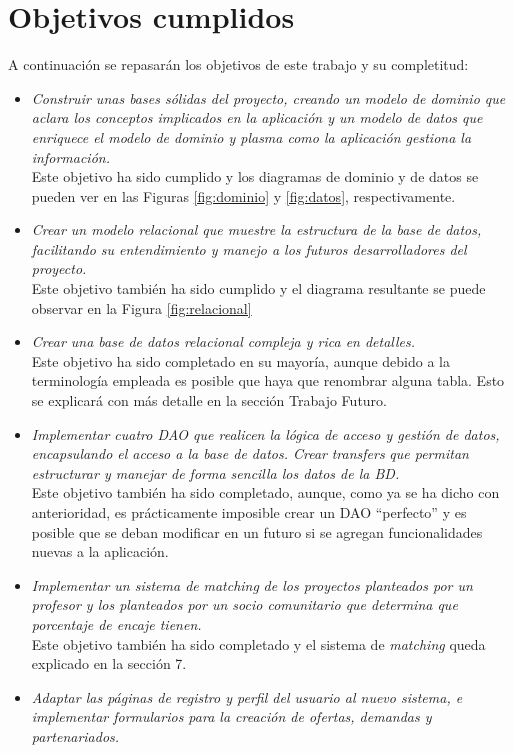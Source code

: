 \documentclass[11pt]{book}
\begin{document}
\section{Objetivos cumplidos}
A continuación se repasarán los objetivos de este trabajo y su completitud:
\begin{itemize}
	\item \emph{Construir unas bases sólidas del proyecto, creando un modelo de dominio que aclara los conceptos implicados en la aplicación y un modelo de datos que enriquece el modelo de dominio y plasma como la aplicación gestiona la información.}\\
	Este objetivo ha sido cumplido y los diagramas de dominio y de datos se pueden ver en las Figuras \ref{fig:dominio} y \ref{fig:datos}, respectivamente.
	\item \emph{Crear un modelo relacional que muestre la estructura de la base de datos, facilitando su entendimiento y manejo a los futuros desarrolladores del proyecto.}\\
	Este objetivo también ha sido cumplido y el diagrama resultante se puede observar en la Figura \ref{fig:relacional}
	\item \emph{Crear una base de datos relacional compleja y rica en detalles.} \\
	Este objetivo ha sido completado en su mayoría, aunque debido a la terminología empleada es posible que haya que renombrar alguna tabla. Esto se explicará con más detalle en la sección Trabajo Futuro.
	\item \emph{Implementar cuatro DAO que realicen la lógica de acceso y gestión de datos, encapsulando el acceso a la base de datos. Crear }\emph{transfers} \emph{que permitan estructurar y manejar de forma sencilla los datos de la BD.} \\
	Este objetivo también ha sido completado, aunque, como ya se ha dicho con anterioridad, es prácticamente imposible crear un DAO ``perfecto'' y es posible que se deban modificar en un futuro si se agregan funcionalidades nuevas a la aplicación.
	\item \emph{Implementar un sistema de} \emph{matching} \emph{de los proyectos planteados por un profesor y los planteados por un socio comunitario que determina que porcentaje de encaje tienen.} \\
	Este objetivo también ha sido completado y el sistema de \emph{matching} queda explicado en la sección 7.
	\item \emph{Adaptar las páginas de registro y perfil del usuario al nuevo sistema, e implementar formularios para la creación de ofertas, demandas y partenariados.} \\

\end{itemize}
\end{document}
